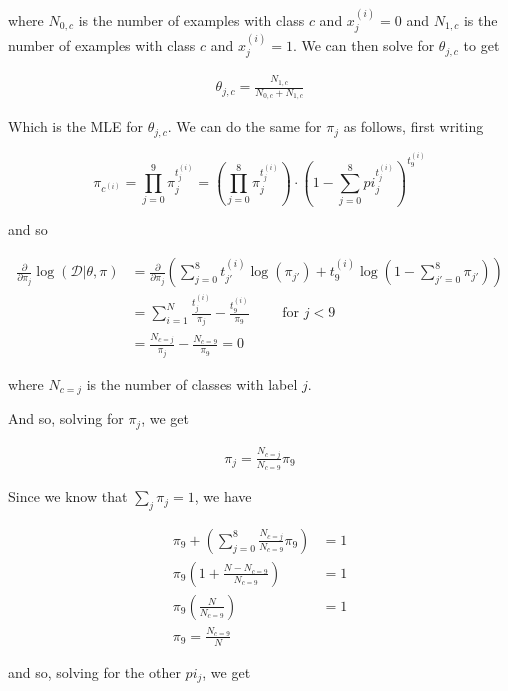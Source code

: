 \documentclass{article}
\begin{document}
\begin{enumerate}[(a)]
    where $N_{0, c}$ is the number of examples with class $c$ and $x_j^{(i)} = 0$ and $N_{1, c}$ is the number of examples with class $c$ and $x_j^{(i)} = 1$. We can then solve for $\theta_{j, c}$ to get

    \begin{align*}
        \theta_{j, c} = \frac{N_{1, c}}{N_{0, c} + N_{1, c}}
    \end{align*}

    Which is the MLE for $\theta_{j, c}$. We can do the same for $\pi_j$ as follows, first writing 

    \[\pi_{c^{(i)}} = \prod_{j = 0}^9 \pi_j^{t_j^{(i)}} = \left(\prod_{j = 0}^8 \pi_{j}^{t_j^{(i)}}\right) \cdot \left(1 - \sum_{j = 0}^8 pi_j^{{t_j^{(i)}}}\right)^{t_9^{(i)}}\] 

    and so 

    \begin{align*}
        \frac{\partial}{\partial \pi_{j}} \log(\mathcal{D} | \theta, \pi) &= \frac{\partial}{\partial \pi_{j}}  \left(\sum_{j = 0}^8 t_{j'}^{(i)} \log(\pi_{j'}) + t_9^{(i)} \log(1 - \sum_{j' = 0}^8 \pi_{j'})\right)\\
        &= \sum_{i = 1}^N \frac{t_j^{(i)}}{\pi_j} - \frac{t_9^{(i)}}{\pi_9} \qquad \text{ for } j < 9 \\
        &= \frac{N_{c = j}}{\pi_j} - \frac{N_{c = 9}}{\pi_9} = 0
    \end{align*}


    where $N_{c = j}$ is the number of classes with label $j$.
    
    And so, solving for $\pi_j$, we get 

    \begin{align*}
        \pi_j = \frac{N_{c = j}}{N_{c = 9}} \pi_9
    \end{align*}

    Since we know that $\sum_j \pi_j = 1$, we have 

    \begin{align*}
        \pi_9 + \left(\sum_{j = 0}^8 \frac{N_{c = j}}{N_{c = 9}} \pi_9\right) &= 1\\
        \pi_9 \left(1 + \frac{N - N_{c = 9}}{N_{c = 9}}\right) &= 1\\
        \pi_9 \left(\frac{N}{N_{c = 9}}\right) &= 1\\
        \pi_9 = \frac{N_{c = 9}}{N}
    \end{align*}

    and so, solving for the other $pi_j$, we get


\end{enumerate}
\end{document}
